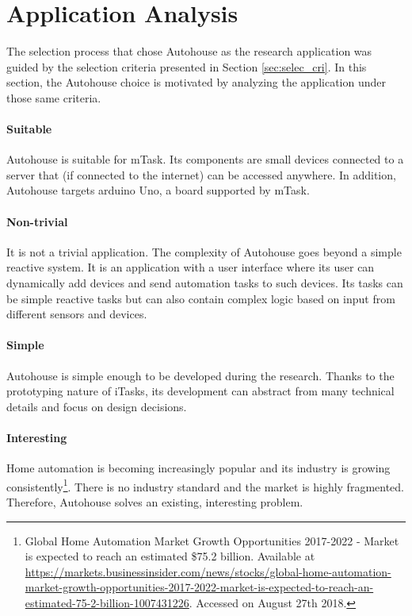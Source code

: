 \section{Application Analysis}\label{sec:app_analysis}

The selection process that chose Autohouse as the research application was guided by the selection criteria presented in Section \ref{sec:selec_cri}. In this section, the Autohouse choice is motivated by analyzing the application under those same criteria.

\paragraph{Suitable} Autohouse is suitable for \gls{mTask}. Its components are small devices connected to a server that (if connected to the internet) can be accessed anywhere. In addition, Autohouse targets \gls{arduino} Uno, a board supported by \gls{mTask}.

\paragraph{Non-trivial} It is not a trivial application. The complexity of Autohouse goes beyond a simple reactive system. It is an application with a user interface where its user can dynamically add devices and send automation tasks to such devices. Its tasks can be simple reactive tasks but can also contain complex logic based on input from different sensors and devices.

\paragraph{Simple} Autohouse is  simple enough to be developed during the research. Thanks to the prototyping nature of \gls{iTasks}, its development can abstract from many technical details and focus on design decisions.

\paragraph{Interesting} Home automation is becoming increasingly popular and its industry is growing consistently\footnote{Global Home Automation Market Growth Opportunities 2017-2022 - Market is expected to reach an estimated \$75.2 billion. Available at \url{https://markets.businessinsider.com/news/stocks/global-home-automation-market-growth-opportunities-2017-2022-market-is-expected-to-reach-an-estimated-75-2-billion-1007431226}. Accessed on August 27th 2018.}. There is no industry standard and the market is highly fragmented. Therefore, Autohouse solves an existing, interesting problem.

